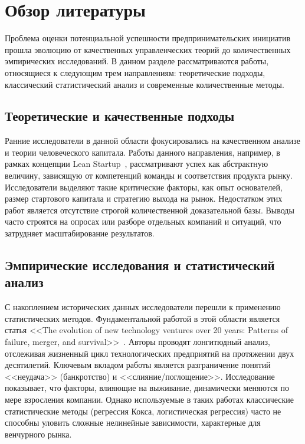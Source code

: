 \newpage

\section{Обзор литературы}
Проблема оценки потенциальной успешности предпринимательских инициатив прошла эволюцию от качественных управленческих теорий до количественных эмпирических исследований. В данном разделе рассматриваются работы, относящиеся к следующим трем направлениям: теоретические подходы, классический статистический анализ и современные количественные методы.

\subsection{Теоретические и качественные подходы}

Ранние исследователи в данной области фокусировались на качественном анализе и теории человеческого капитала. Работы данного направления, например, в рамках концепции Lean Startup~\cite{lean-startup}, рассматривают успех как абстрактную величину, зависящую от компетенций команды и соответствия продукта рынку. Исследователи выделяют такие критические факторы, как опыт основателей, размер стартового капитала и стратегию выхода на рынок. Недостатком этих работ является отсутствие строгой количественной доказательной базы. Выводы часто строятся на опросах или разборе отдельных компаний и ситуаций, что затрудняет масштабирование результатов.

\subsection{Эмпирические исследования и статистический анализ}

С накоплением исторических данных исследователи перешли к применению статистических методов. Фундаментальной работой в этой области является статья <<The evolution of new technology ventures over 20 years: Patterns of failure, merger, and survival>>~\cite{old-study}. Авторы проводят лонгитюдный анализ, отслеживая жизненный цикл технологических предприятий на протяжении двух десятилетий. Ключевым вкладом работы является разграничение понятий <<неудача>> (банкротство) и <<слияние/поглощение>>. Исследование показывает, что факторы, влияющие на выживание, динамически меняются по мере взросления компании. Однако используемые в таких работах классические статистические методы (регрессия Кокса, логистическая регрессия) часто не способны уловить сложные нелинейные зависимости, характерные для венчурного рынка.

